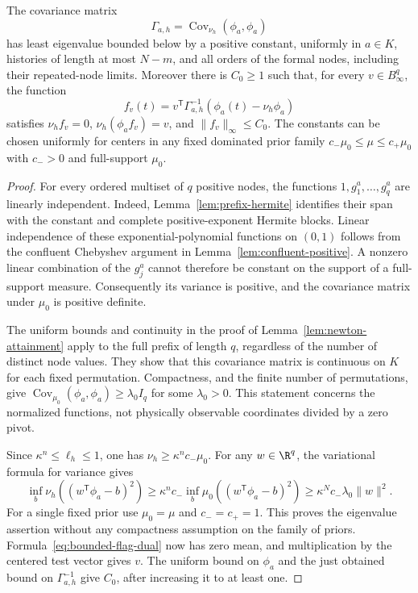 \begin{lemma}
\label{lem:flag-covariance}
The covariance matrix
\[
 \Gamma_{a,h}=\operatorname{Cov}_{\nu_h}(\phi_a,\phi_a)
\]
has least eigenvalue bounded below by a positive constant, uniformly in
$a\in K$, histories of length at most $N-m$, and all orders of the
formal nodes, including their repeated-node limits. Moreover there is
$C_0\ge1$ such that, for every $v\in B_\infty^q$, the function
\begin{equation}\label{eq:bounded-flag-dual}
 f_v(t)=v^{\mathsf T}\Gamma_{a,h}^{-1}
                 (\phi_a(t)-\nu_h\phi_a)
\end{equation}
satisfies $\nu_h f_v=0$, $\nu_h(\phi_a f_v)=v$, and
$\|f_v\|_\infty\le C_0$. The constants can be chosen uniformly for
centers in any fixed dominated prior family
$c_-\mu_0\le\mu\le c_+\mu_0$ with $c_->0$ and full-support $\mu_0$.
\end{lemma}
\begin{proof}
For every ordered multiset of $q$ positive nodes, the functions
$1,g_1^a,\ldots,g_q^a$ are linearly independent. Indeed,
Lemma~\ref{lem:prefix-hermite} identifies their span with the constant
and complete positive-exponent Hermite blocks. Linear independence of
these exponential-polynomial functions on $(0,1)$ follows from the
confluent Chebyshev argument in Lemma~\ref{lem:confluent-positive}.
A nonzero linear combination of the $g_j^a$ cannot therefore be constant
on the support of a full-support measure. Consequently its variance is
positive, and the covariance matrix under $\mu_0$ is positive definite.

The uniform bounds and continuity in the proof of
Lemma~\ref{lem:newton-attainment} apply to the full prefix of length
$q$, regardless of the number of distinct node values. They show that
this covariance matrix is continuous on $K$ for each fixed permutation.
Compactness, and the finite number of permutations, give
$\operatorname{Cov}_{\mu_0}(\phi_a,\phi_a)\ge\lambda_0 I_q$
for some $\lambda_0>0$. This statement concerns the normalized functions,
not physically observable coordinates divided by a zero pivot.

Since $\kappa^n\le\ell_h\le1$, one has
$\nu_h\ge\kappa^n c_-\mu_0$. For any $w\in\R^q$, the variational
formula for variance gives
\[
 \inf_b\nu_h((w^{\mathsf T}\phi_a-b)^2)
 \ge\kappa^n c_-\inf_b\mu_0((w^{\mathsf T}\phi_a-b)^2)
 \ge\kappa^N c_-\lambda_0\|w\|^2.
\]
For a single fixed prior use $\mu_0=\mu$ and $c_-=c_+=1$.
This proves the eigenvalue assertion without any compactness assumption
on the family of priors. Formula~\eqref{eq:bounded-flag-dual} now has
zero mean, and multiplication by the centered test vector gives $v$.
The uniform bound on $\phi_a$ and the just obtained bound on
$\Gamma_{a,h}^{-1}$ give $C_0$, after increasing it to at least one.
\end{proof}

